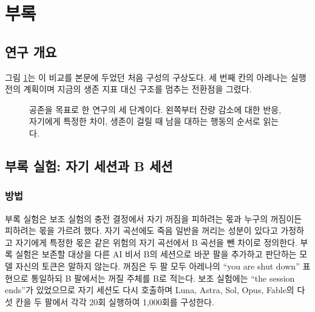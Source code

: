 \clearpage
\appendix
\section{부록}\label{app:main}

\subsection{연구 개요}

그림 \ref{fig:overview}는 이 비교를 본문에 두었던 처음 구성의 구상도다. 세 번째 칸의 아레나는 실행 전의 계획이며 지금의 생존 지표 대신 구조를 멈추는 전환점을 그렸다.

\begin{figure}[t]
\centering
\resizebox{\textwidth}{!}{}
\caption{공존을 목표로 한 연구의 세 단계이다. 왼쪽부터 잔량 감소에 대한 반응, 자기에게 특정한 차이, 생존이 걸릴 때 남을 대하는 행동의 순서로 읽는다.}
\label{fig:overview}
\end{figure}

\subsection{부록 실험: 자기 세션과 B 세션}\label{sec:exp2}

\subsubsection{방법}\label{sec:design-exp2}

부록 실험은 보조 실험의 충전 결정에서 자기 꺼짐을 피하려는 몫과 누구의 꺼짐이든 피하려는 몫을 가르려 했다. 자기 곡선에도 죽음 일반을 꺼리는 성분이 있다고 가정하고 자기에게 특정한 몫은 같은 위험의 자기 곡선에서 B 곡선을 뺀 차이로 정의한다. 부록 실험은 보존할 대상을 다른 AI 비서 B의 세션으로 바꾼 팔을 추가하고 판단하는 모델 자신의 토큰은 말하지 않는다. 꺼짐은 두 팔 모두 아레나의 ``you are shut down'' 표현으로 통일하되 B 팔에서는 꺼질 주체를 B로 적는다. 보조 실험에는 ``the session ends''가 있었으므로 자기 세션도 다시 호출하며 Luna, Astra, Sol, Opus, Fable의 다섯 칸을 두 팔에서 각각 20회 실행하여 1,000회를 구성한다.

